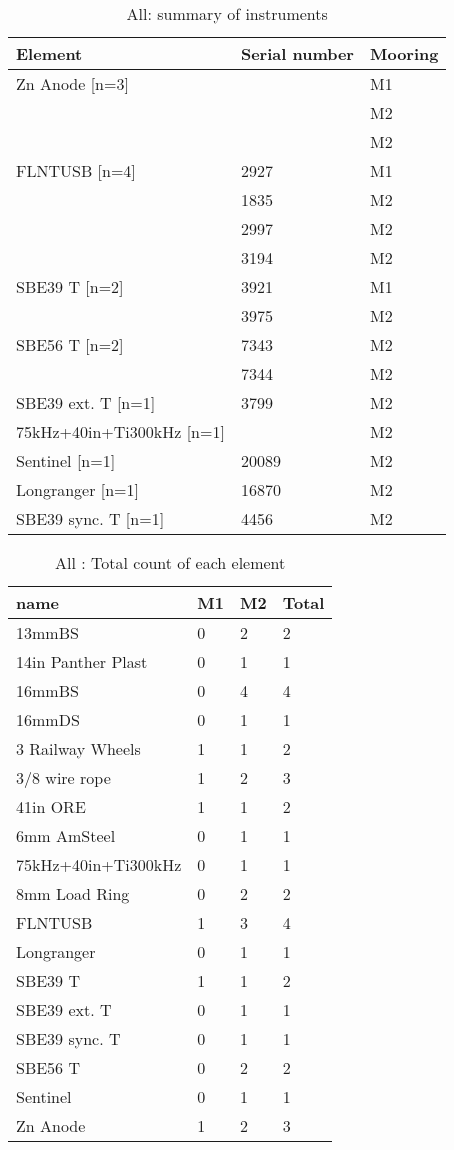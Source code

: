 \documentclass{article}
\begin{document}
\begin{table}[!htbp]
\centering
\caption{All: summary of instruments}
\begin{tabular}{lll}
\toprule
Element & Serial number & Mooring \\
\midrule
Zn Anode [n=3] &  & M1 \\
 &  & M2 \\
 &  & M2 \\
FLNTUSB [n=4] & 2927 & M1 \\
 & 1835 & M2 \\
 & 2997 & M2 \\
 & 3194 & M2 \\
SBE39 T [n=2] & 3921 & M1 \\
 & 3975 & M2 \\
SBE56 T [n=2] & 7343 & M2 \\
 & 7344 & M2 \\
SBE39 ext. T [n=1] & 3799 & M2 \\
75kHz+40in+Ti300kHz [n=1] &  & M2 \\
Sentinel [n=1] & 20089 & M2 \\
Longranger [n=1] & 16870 & M2 \\
SBE39 sync. T [n=1] & 4456 & M2 \\
\bottomrule
\end{tabular}
\end{table}

\begin{table}[!htbp]
\centering
\caption{All : Total count of each element}
\begin{tabular}{llll}
\toprule
name & M1 & M2 & Total \\
\midrule
13mmBS & 0 & 2 & 2 \\
14in Panther Plast & 0 & 1 & 1 \\
16mmBS & 0 & 4 & 4 \\
16mmDS & 0 & 1 & 1 \\
3 Railway Wheels & 1 & 1 & 2 \\
3/8 wire rope & 1 & 2 & 3 \\
41in ORE & 1 & 1 & 2 \\
6mm AmSteel & 0 & 1 & 1 \\
75kHz+40in+Ti300kHz & 0 & 1 & 1 \\
8mm Load Ring & 0 & 2 & 2 \\
FLNTUSB & 1 & 3 & 4 \\
Longranger & 0 & 1 & 1 \\
SBE39 T & 1 & 1 & 2 \\
SBE39 ext. T & 0 & 1 & 1 \\
SBE39 sync. T & 0 & 1 & 1 \\
SBE56 T & 0 & 2 & 2 \\
Sentinel & 0 & 1 & 1 \\
Zn Anode & 1 & 2 & 3 \\
\bottomrule
\end{tabular}
\end{table}
\end{document}
